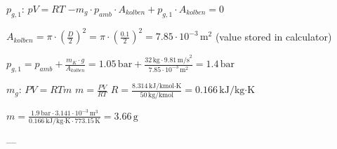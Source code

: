 \( p_{g,1} \): \( pV = RT \)  
\(-m_{g} \cdot p_{amb} \cdot A_{kolben} + p_{g,1} \cdot A_{kolben} = 0\)  

\( A_{kolben} = \pi \cdot \left(\frac{D}{2}\right)^2 = \pi \cdot \left(\frac{0.1}{2}\right)^2 = 7.85 \cdot 10^{-3} \, \text{m}^2 \) (value stored in calculator)  

\( p_{g,1} = p_{amb} + \frac{m_{K} \cdot g}{A_{kolben}} = 1.05 \, \text{bar} + \frac{32 \, \text{kg} \cdot 9.81 \, \text{m/s}^2}{7.85 \cdot 10^{-3} \, \text{m}^2} = 1.4 \, \text{bar} \)  

\( m_{g} \): \( PV = RTm \)  
\( m = \frac{PV}{RT} \)  
\( R = \frac{8.314 \, \text{kJ/kmol·K}}{50 \, \text{kg/kmol}} = 0.166 \, \text{kJ/kg·K} \)  

\( m = \frac{1.9 \, \text{bar} \cdot 3.141 \cdot 10^{-3} \, \text{m}^3}{0.166 \, \text{kJ/kg·K} \cdot 773.15 \, \text{K}} = 3.66 \, \text{g} \)  

---